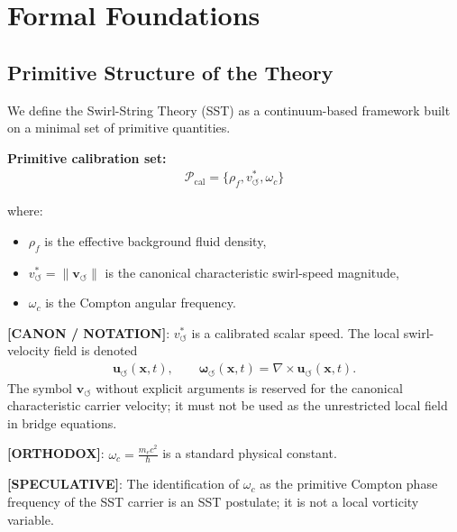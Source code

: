 \documentclass[11pt]{article}
\theoremstyle{definition}
\theoremstyle{plain}
\theoremstyle{remark}
\newcommand{\rhoF}{{\rho_{\!f}}}
\newcommand{\vchar}{v_{\!\boldsymbol{\circlearrowleft}}^{\ast}}
\newcommand{\uswirl}{\mathbf{u}_{\!\boldsymbol{\circlearrowleft}}}
\newcommand{\omegaswirl}{\boldsymbol{\omega}_{\!\boldsymbol{\circlearrowleft}}}
\begin{document}
\section{Formal Foundations}
    \label{sec:foundations}
    
    \subsection{Primitive Structure of the Theory}
        
        We define the Swirl-String Theory (SST) as a continuum-based framework built on a minimal set of primitive quantities.
        
        \textbf{Primitive calibration set:}
        \begin{align}
            \mathcal{P}_{\mathrm{cal}} = \{ \rhoF, \vchar, \omega_c \}
        \end{align}
        
        where:
        \begin{itemize}
            \item $\rhoF$ is the effective background fluid density,
            \item $\vchar=\lVert\mathbf{v}_{\!\boldsymbol{\circlearrowleft}}\rVert$ is the canonical characteristic swirl-speed magnitude,
            \item $\omega_c$ is the Compton angular frequency.
        \end{itemize}

        \textbf{[CANON / NOTATION]}: $\vchar$ is a calibrated scalar speed. The local swirl-velocity field is denoted
        \begin{align}
            \uswirl(\mathbf{x},t),
            \qquad
            \omegaswirl(\mathbf{x},t)=\nabla\times\uswirl(\mathbf{x},t).
        \end{align}
        The symbol $\mathbf{v}_{\!\boldsymbol{\circlearrowleft}}$ without explicit arguments is reserved for the canonical characteristic carrier velocity; it must not be used as the unrestricted local field in bridge equations.
        
        \textbf{[ORTHODOX]}: $\omega_c = \frac{m_e c^2}{\hbar}$ is a standard physical constant.
        
        \textbf{[SPECULATIVE]}: The identification of $\omega_c$ as the primitive Compton phase frequency of the SST carrier is an SST postulate; it is not a local vorticity variable.
    
\end{document}
